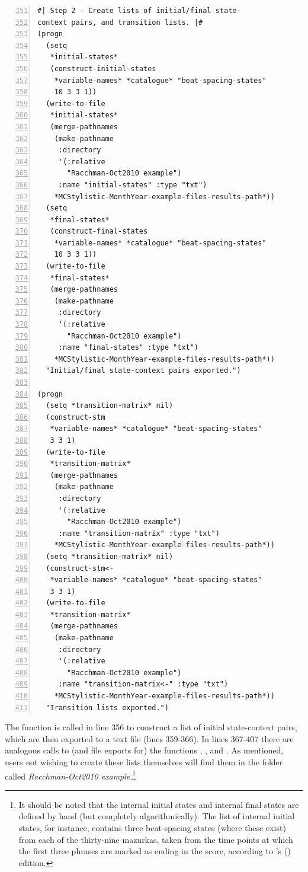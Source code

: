 \begin{Verbatim}[frame=single,numbers=left,firstnumber=351]
#| Step 2 - Create lists of initial/final state-
context pairs, and transition lists. |#
(progn
  (setq
   *initial-states*
   (construct-initial-states
    *variable-names* *catalogue* "beat-spacing-states"
    10 3 3 1))
  (write-to-file
   *initial-states*
   (merge-pathnames
    (make-pathname
     :directory
     '(:relative
       "Racchman-Oct2010 example")
     :name "initial-states" :type "txt")
    *MCStylistic-MonthYear-example-files-results-path*))
  (setq
   *final-states*
   (construct-final-states
    *variable-names* *catalogue* "beat-spacing-states"
    10 3 3 1))
  (write-to-file
   *final-states*
   (merge-pathnames
    (make-pathname
     :directory
     '(:relative
       "Racchman-Oct2010 example")
     :name "final-states" :type "txt")
    *MCStylistic-MonthYear-example-files-results-path*))
  "Initial/final state-context pairs exported.")
  
(progn
  (setq *transition-matrix* nil)
  (construct-stm
   *variable-names* *catalogue* "beat-spacing-states"
   3 3 1)
  (write-to-file
   *transition-matrix*
   (merge-pathnames
    (make-pathname
     :directory
     '(:relative
       "Racchman-Oct2010 example")
     :name "transition-matrix" :type "txt")
    *MCStylistic-MonthYear-example-files-results-path*))
  (setq *transition-matrix* nil)
  (construct-stm<-
   *variable-names* *catalogue* "beat-spacing-states"
   3 3 1)
  (write-to-file
   *transition-matrix*
   (merge-pathnames
    (make-pathname
     :directory
     '(:relative
       "Racchman-Oct2010 example")
     :name "transition-matrix<-" :type "txt")
    *MCStylistic-MonthYear-example-files-results-path*))
  "Transition lists exported.")
\end{Verbatim}
The function  is called in line 356 to construct a list of initial state-context pairs, which are then exported to a text file (lines 359-366). In lines 367-407 there are analogous calls to (and file exports for) the functions , , and . As mentioned, users not wishing to create these lists themselves will find them in the folder called \emph{Racchman-Oct2010 example}.\footnote{It should be noted that the internal initial states and internal final states are defined by hand (but completely algorithmically). The list of internal initial states, for instance, contains three beat-spacing states (where these exist) from each of the thirty-nine mazurkas, taken from the time points at which the first three phrases are marked as ending in the score, according to \citeauthor*{paderewski1953}'s (\citeyear{paderewski1953}) edition.} 

